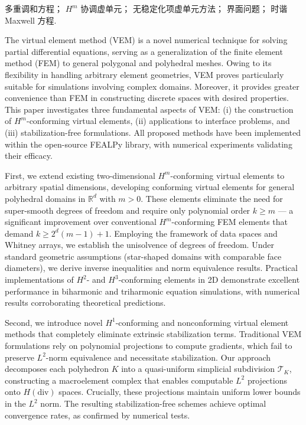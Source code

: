 \begin{cnkeywords}
多重调和方程；
$H^m$ 协调虚单元；
无稳定化项虚单元方法；
界面问题；
时谐 Maxwell 方程.
\end{cnkeywords}
\newpage
\begin{enabstract}

The virtual element method (VEM) is a novel numerical technique for solving partial differential equations, serving as a generalization of the finite element method (FEM) to general polygonal and polyhedral meshes. Owing to its flexibility in handling arbitrary element geometries, VEM proves particularly suitable for simulations involving complex domains. Moreover, it provides greater convenience than FEM in constructing discrete spaces with desired properties. This paper investigates three fundamental aspects of VEM: (i) the construction of \(H^m\)-conforming virtual elements, (ii) applications to interface problems, and (iii) stabilization-free formulations. All proposed methods have been implemented within the open-source FEALPy library, with numerical experiments validating their efficacy.

First, we extend existing two-dimensional \(H^m\)-conforming virtual elements to
arbitrary spatial dimensions, developing conforming virtual elements for general
polyhedral domains in \(\mathbb{R}^d\) with \(m > 0\). These elements eliminate
the need for super-smooth degrees of freedom and require only polynomial order
\(k \geq m\) --- a significant improvement over conventional \(H^m\)-conforming FEM elements that demand \(k \geq 2^d(m-1)+1\). Employing the framework of data spaces and Whitney arrays, we establish the unisolvence of degrees of freedom. Under standard geometric assumptions (star-shaped domains with comparable face diameters), we derive inverse inequalities and norm equivalence results. Practical implementations of \(H^2\)- and \(H^3\)-conforming elements in 2D demonstrate excellent performance in biharmonic and triharmonic equation simulations, with numerical results corroborating theoretical predictions.

Second, we introduce novel \(H^1\)-conforming and nonconforming virtual element methods that completely eliminate extrinsic stabilization terms. Traditional VEM formulations rely on polynomial projections to compute gradients, which fail to preserve \(L^2\)-norm equivalence and necessitate stabilization. Our approach decomposes each polyhedron \(K\) into a quasi-uniform simplicial subdivision \(\mathcal{T}_K\), constructing a macroelement complex that enables computable \(L^2\) projections onto \(H(\text{div})\) spaces. Crucially, these projections maintain uniform lower bounds in the \(L^2\) norm. The resulting stabilization-free schemes achieve optimal convergence rates, as confirmed by numerical tests.


\end{enabstract}

